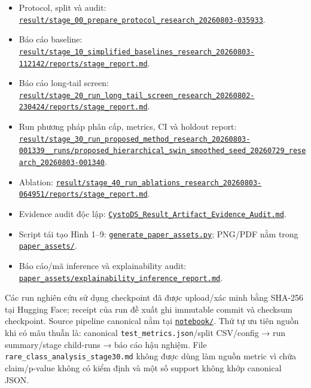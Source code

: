\documentclass[
  10pt,
  a4paper,
  twocolumn]{article}
\providecommand{\tightlist}{%
  \setlength{\itemsep}{0pt}\setlength{\parskip}{0pt}}
\begin{document}
\begin{itemize}
\tightlist
\item
  Protocol, split và audit:
  \href{../result/stage_00_prepare_protocol_research_20260803-035933/}{\nolinkurl{result/stage_00_prepare_protocol_research_20260803-035933}}.
\item
  Báo cáo baseline:
  \href{../result/stage_10_simplified_baselines_research_20260803-112142/reports/stage_report.md}{\nolinkurl{result/stage_10_simplified_baselines_research_20260803-112142/reports/stage_report.md}}.
\item
  Báo cáo long-tail screen:
  \href{../result/stage_20_run_long_tail_screen_research_20260802-230424/reports/stage_report.md}{\nolinkurl{result/stage_20_run_long_tail_screen_research_20260802-230424/reports/stage_report.md}}.
\item
  Run phương pháp phân cấp, metrics, CI và holdout report:
  \href{../result/stage_30_run_proposed_method_research_20260803-001339__runs/proposed_hierarchical_swin_smoothed_seed_20260729_research_20260803-001340/}{\nolinkurl{result/stage_30_run_proposed_method_research_20260803-001339__runs/proposed_hierarchical_swin_smoothed_seed_20260729_research_20260803-001340}}.
\item
  Ablation:
  \href{../result/stage_40_run_ablations_research_20260803-064951/reports/stage_report.md}{\nolinkurl{result/stage_40_run_ablations_research_20260803-064951/reports/stage_report.md}}.
\item
  Evidence audit độc lập:
  \href{CystoDS_Result_Artifact_Evidence_Audit.md}{\nolinkurl{CystoDS_Result_Artifact_Evidence_Audit.md}}.
\item
  Script tái tạo Hình 1--9:
  \href{generate_paper_assets.py}{\nolinkurl{generate_paper_assets.py}};
  PNG/PDF nằm trong \href{paper_assets/}{\nolinkurl{paper_assets/}}.
\item
  Báo cáo/mã inference và explainability audit:
  \href{paper_assets/explainability_inference_report.md}{\nolinkurl{paper_assets/explainability_inference_report.md}}.
\end{itemize}

Các run nghiên cứu sử dụng checkpoint đã được upload/xác minh bằng
SHA-256 tại Hugging Face; receipt của run đề xuất ghi immutable commit
\texttt{} và checksum
checkpoint. Source pipeline canonical nằm tại
\href{../notebook/}{\nolinkurl{notebook/}}. Thứ tự ưu tiên nguồn khi có mâu
thuẫn là: canonical \texttt{test\_metrics.json}/split CSV/config →\allowbreak{} run
summary/stage child-runs →\allowbreak{} báo cáo hậu nghiệm. File
\texttt{rare\_class\_analysis\_stage30.md} không được dùng làm nguồn
metric vì chứa claim/p-value không có kiểm định và một số support không
khớp canonical JSON.
\end{document}
